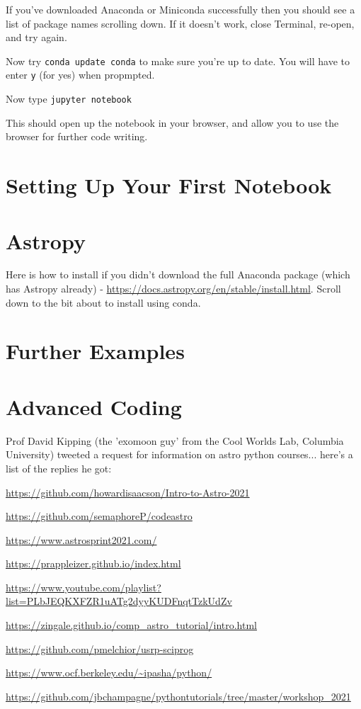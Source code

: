 \documentclass{article}
\newcommand{\code}[1]{\colorbox{light-gray}{\texttt{#1}}}
\begin{document}
If you've downloaded Anaconda or Miniconda successfully then you should see a list of package names scrolling down. If it doesn't work, close Terminal, re-open, and try again.

Now try \code{conda update conda} to make sure you're up to date. You will have to enter \code{y} (for yes) when propmpted. 

Now type \code{jupyter notebook}

This should open up the notebook in your browser, and allow you to use the browser for further code writing. 

\section{Setting Up Your First Notebook}


\section{Astropy}

Here is how to install if you didn't download the full Anaconda package (which has Astropy already) - \url{https://docs.astropy.org/en/stable/install.html}. Scroll down to the bit about to install using conda. 


\section{Further Examples}

\section{Advanced Coding}

Prof David Kipping (the 'exomoon guy' from the Cool Worlds Lab, Columbia University) tweeted a request for information on astro python courses... here's a list of the replies he got:

\url{https://github.com/howardisaacson/Intro-to-Astro-2021}

\url{https://github.com/semaphoreP/codeastro}

\url{https://www.astrosprint2021.com/}

\url{https://prappleizer.github.io/index.html}

\url{https://www.youtube.com/playlist?list=PLbJEQKXFZR1uATg2dyyKUDFnqtTzkUdZv}

\url{https://zingale.github.io/comp_astro_tutorial/intro.html}

\url{https://github.com/pmelchior/usrp-sciprog}

\url{https://www.ocf.berkeley.edu/~ipasha/python/}

\url{https://github.com/jbchampagne/pythontutorials/tree/master/workshop_2021}
\end{document}
